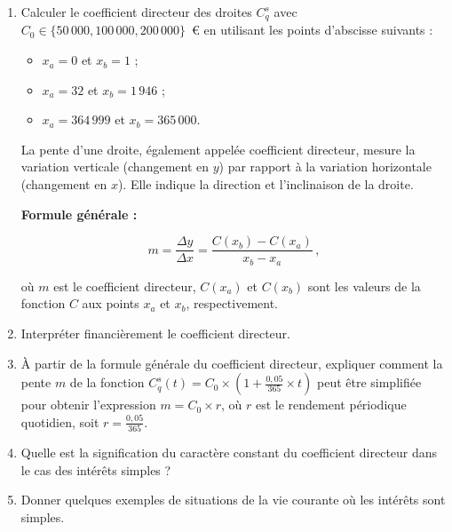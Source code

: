 \documentclass{article}
\begin{document}
\begin{enumerate}[label=\textbf{Q1.\arabic*}]
	\item Calculer le coefficient directeur des droites \( C^s_q \) avec \( C_0 \in \{50\,000, 100\,000, 200\,000\} \)~€ en utilisant les points d'abscisse suivants :
	      \begin{itemize}
	      	\item \( x_a = 0 \) et \( x_b = 1 \) ;
	      	\item \( x_a = 32 \) et \( x_b = 1\,946 \) ;
	      	\item \( x_a = 364\,999 \) et \( x_b = 365\,000 \).
	      \end{itemize}
	      \begin{tcolorbox}[
	      		colback=lightgreen,
	      		colframe=lightgreen,
	      		boxrule=0.5pt,
	      		arc=0pt,
	      		left=10pt,
	      		right=10pt,
	      		top=6pt,
	      		bottom=6pt,
	      		boxsep=2pt,
	      		before upper={\faLightbulb\hspace{10pt}}
	      	]
	      	La pente d'une droite, également appelée coefficient directeur, mesure la variation verticale (changement en \( y \)) par rapport à la variation horizontale (changement en \( x \)). Elle indique la direction et l'inclinaison de la droite.
	      	    
	      	\textbf{Formule générale :}
	      	    
	      	\[
	      		m = \frac{\Delta y}{\Delta x} = \frac{C(x_b) - C(x_a)}{x_b - x_a}\,,
	      	\]
	      	    
	      	où \( m \) est le coefficient directeur, \( C(x_a) \) et \( C(x_b) \) sont les valeurs de la fonction \( C \) aux points \( x_a \) et \( x_b \), respectivement.
	      \end{tcolorbox}
	      
	\item Interpréter financièrement le coefficient directeur.
	      
	\item À partir de la formule générale du coefficient directeur, expliquer comment la pente \( m \) de la fonction \( C_q^s(t) = C_0 \times \left(1 + \frac{0{,}05}{365} \times t\right) \) peut être simplifiée pour obtenir l'expression \( m = C_0 \times r \), où \( r \) est le rendement périodique quotidien, soit \( r = \frac{0{,}05}{365} \).
	      
	\item Quelle est la signification du caractère constant du coefficient directeur dans le cas des intérêts simples ?
	      
	\item Donner quelques exemples de situations de la vie courante où les intérêts sont simples.
	      

\end{enumerate}
\end{document}
